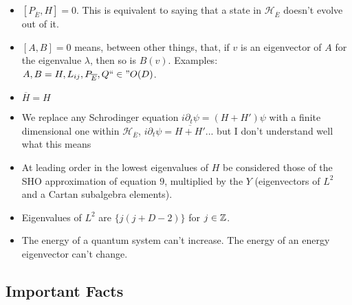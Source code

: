 \documentclass{article}
\newcommand{\cut}[1]{\overline{#1}}
\begin{document}
    \begin{itemize}

    \item $[P_{\cut E}, H] = 0$. This is equivalent to saying that a state in $\mathcal H_{\cut E}$ doesn't evolve out of it.
    
    \item $[A, B] = 0$ means, between other things, that, if $v$ is an eigenvector of $A$ for the eigenvalue $\lambda$, then so is $B(v)$. Examples: $A, B = H, L_{ij}, P_{\cut E}, Q ``\in" O(D)$.
    
    \item $\cut H = H$
    
    \item We replace any Schrodinger equation $i \partial_t \psi = (H + H')\psi$ with a finite dimensional one within $\mathcal H_{\cut E}$, $i \partial_t \psi = \cut{H + H'}$... but I don't understand well what this means
    
    \item At leading order in  the lowest eigenvalues of $H$ be considered those of the SHO approximation of equation $9$, multiplied by the $Y$ (eigenvectors of $L^2$ and a Cartan subalgebra elements).
    
    \item Eigenvalues of $L^2$ are $\{j(j+D-2)\}$ for $j \in \mathbb{Z}$.
    
    \item The energy of a quantum system can't increase. The energy of an energy eigenvector can't change.
    
    \end{itemize}

\subsection*{Important Facts}
\end{document}
